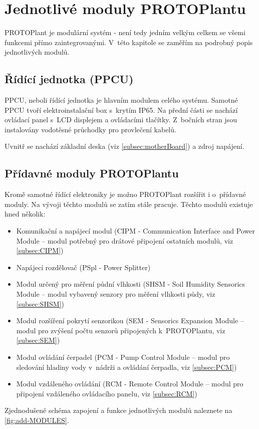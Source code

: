 \chapter{Jednotlivé moduly PROTOPlantu}
PROTOPlant je modulární systém - není tedy jedním velkým celkem se všemi funkcemi přímo zaintegrovanými.
V~této kapitole se zaměřím na podrobný popis jednotlivých modulů.

\section{Řídící jednotka (PPCU)}
PPCU, neboli řídící jednotka je hlavním modulem celého systému.
Samotné PPCU tvoří elektroinstalační box s~krytím IP65.
Na přední části se nachází ovládací panel s~LCD displejem a ovládacími tlačítky.
Z~bočních stran jsou instalovány vodotěsné průchodky pro provlečení kabelů.

Uvnitř se nachází základní deska (viz \autoref{subsec:motherBoard}) a zdroj napájení.

\section{Přídavné moduly PROTOPlantu}
Kromě samotné řídící elektroniky je možno PROTOPlant rozšířit i o~přídavné moduly. 
Na vývoji těchto modulů se zatím stále pracuje.
Těchto modulů existuje hned několik:

\begin{itemize}
    \item Komunikační a napájecí modul (CIPM - Communication Interface and Power Module -- modul potřebný pro drátové připojení ostatních modulů, viz \autoref{subsec:CIPM})
    \item Napájecí rozdělovač (PSpl - Power Splitter)
    \item Modul určený pro měření půdní vlhkosti (SHSM - Soil Humidity Sensorics Module -- modul vybavený senzory pro měření vlhkosti půdy, viz \autoref{subsec:SHSM})
    \item Modul rozšíření pokrytí senzorikou (SEM - Sensorics Expansion Module -- modul pro zvýšení počtu senzorů připojených k~PROTOPlantu, viz \autoref{subsec:SEM})
    \item Modul ovládání čerpadel (PCM - Pump Control Module -- modul pro sledování hladiny vody v~nádrži a ovládání čerpadla, viz \autoref{subsec:PCM})
    \item Modul vzdáleného ovládání (RCM - Remote Control Module -- modul pro připojení vzdáleného ovládacího panelu, viz \autoref{subsec:RCM})
\end{itemize}
Zjednodušené schéma zapojení a funkce jednotlivých modulů naleznete na \autoref{fig:add-MODULES}.

